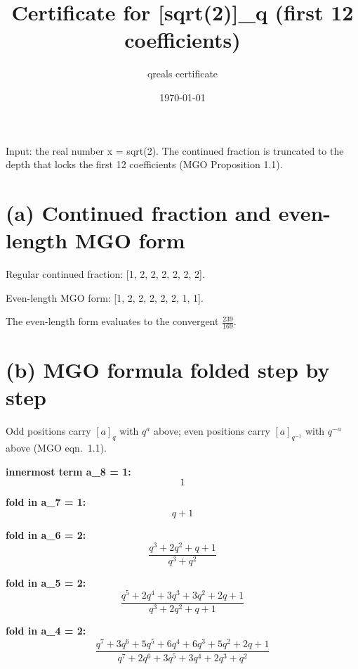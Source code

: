 \documentclass[11pt]{article}
\title{Certificate for [sqrt(2)]\_q (first 12 coefficients)}
\author{qreals certificate}
\date{\today}
\begin{document}
\maketitle

\noindent Input: the real number x = sqrt(2). The continued fraction is truncated to the depth that locks the first 12 coefficients (MGO Proposition 1.1).

\section*{(a) Continued fraction and even-length MGO form}
Regular continued fraction: [1, 2, 2, 2, 2, 2, 2]. \par
Even-length MGO form: [1, 2, 2, 2, 2, 2, 1, 1]. \par
The even-length form evaluates to the convergent $ \frac{239}{169} $.\par

\section*{(b) MGO formula folded step by step}
Odd positions carry $[a]_q$ with $q^a$ above; even positions carry
$[a]_{q^{-1}}$ with $q^{-a}$ above (MGO eqn.~1.1).

\noindent\textbf{innermost term a\_8 = 1:}
{\footnotesize%
\begin{dmath*}
1
\end{dmath*}
}

\noindent\textbf{fold in a\_7 = 1:}
{\footnotesize%
\begin{dmath*}
q + 1
\end{dmath*}
}

\noindent\textbf{fold in a\_6 = 2:}
{\footnotesize%
\begin{dmath*}
\frac{q^{3} + 2 q^{2} + q + 1}{q^{3} + q^{2}}
\end{dmath*}
}

\noindent\textbf{fold in a\_5 = 2:}
{\footnotesize%
\begin{dmath*}
\frac{q^{5} + 2 q^{4} + 3 q^{3} + 3 q^{2} + 2 q + 1}{q^{3} + 2 q^{2} + q + 1}
\end{dmath*}
}

\noindent\textbf{fold in a\_4 = 2:}
{\footnotesize%
\begin{dmath*}
\frac{q^{7} + 3 q^{6} + 5 q^{5} + 6 q^{4} + 6 q^{3} + 5 q^{2} + 2 q + 1}{q^{7} + 2 q^{6} + 3 q^{5} + 3 q^{4} + 2 q^{3} + q^{2}}
\end{dmath*}
}
\end{document}
